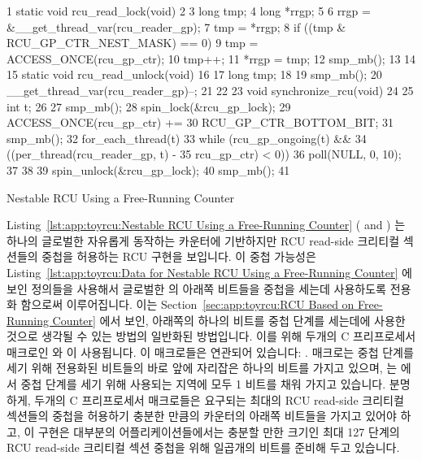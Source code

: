 \begin{listing}[tb]
{ \scriptsize
\begin{verbbox}
 1 static void rcu_read_lock(void)
 2 {
 3   long tmp;
 4   long *rrgp;
 5 
 6   rrgp = &__get_thread_var(rcu_reader_gp);
 7   tmp = *rrgp;
 8   if ((tmp & RCU_GP_CTR_NEST_MASK) == 0)
 9     tmp = ACCESS_ONCE(rcu_gp_ctr);
10   tmp++;
11   *rrgp = tmp;
12   smp_mb();
13 }
14 
15 static void rcu_read_unlock(void)
16 {
17   long tmp;
18 
19   smp_mb();
20   __get_thread_var(rcu_reader_gp)--;
21 }
22 
23 void synchronize_rcu(void)
24 {
25   int t;
26 
27   smp_mb();
28   spin_lock(&rcu_gp_lock);
29   ACCESS_ONCE(rcu_gp_ctr) +=
30     RCU_GP_CTR_BOTTOM_BIT;
31   smp_mb();
32   for_each_thread(t) {
33     while (rcu_gp_ongoing(t) &&
34            ((per_thread(rcu_reader_gp, t) -
35              rcu_gp_ctr) < 0)) {
36       poll(NULL, 0, 10);
37     }
38   }
39   spin_unlock(&rcu_gp_lock);
40   smp_mb();
41 }
\end{verbbox}
}
\centering
\theverbbox
\caption{Nestable RCU Using a Free-Running Counter}
\label{lst:app:toyrcu:Nestable RCU Using a Free-Running Counter}
\end{listing}

Listing~\ref{lst:app:toyrcu:Nestable RCU Using a Free-Running Counter}
( and )
는 하나의 글로벌한 자유롭게 동작하는 카운터에 기반하지만 RCU read-side 크리티컬
섹션들의 중첩을 허용하는 RCU 구현을 보입니다.
이 중첩 가능성은
Listing~\ref{lst:app:toyrcu:Data for Nestable RCU Using a Free-Running Counter} 에
보인 정의들을 사용해서 글로벌한  의 아래쪽 비트들을 중첩을
세는데 사용하도록 전용화 함으로써 이루어집니다.
이는
Section~\ref{sec:app:toyrcu:RCU Based on Free-Running Counter} 에서 보인, 아래쪽의
하나의 비트를 중첩 단계를 세는데에 사용한 것으로 생각될 수 있는 방법의 일반화된
방법입니다.
이를 위해 두개의 C 프리프로세서 매크로인  와
 이 사용됩니다.
이 매크로들은 연관되어 있습니다:
.
 매크로는 중첩 단계를 세기 위해 전용화된 비트들의
바로 앞에 자리잡은 하나의 비트를 가지고 있으며,  는
 에서 중첩 단계를 세기 위해 사용되는 지역에 모두 1 비트를 채워
가지고 있습니다.
분명하게, 두개의 C 프리프로세서 매크로들은 요구되는 최대의 RCU read-side
크리티컬 섹션들의 중첩을 허용하기 충분한 만큼의 카운터의 아래쪽 비트들을 가지고
있어야 하고, 이 구현은 대부분의 어플리케이션들에서는 충분할 만한 크기인 최대
127 단계의 RCU read-side 크리티컬 섹션 중첩을 위해 일곱개의 비트를 준비해 두고
있습니다.
\iffalse

